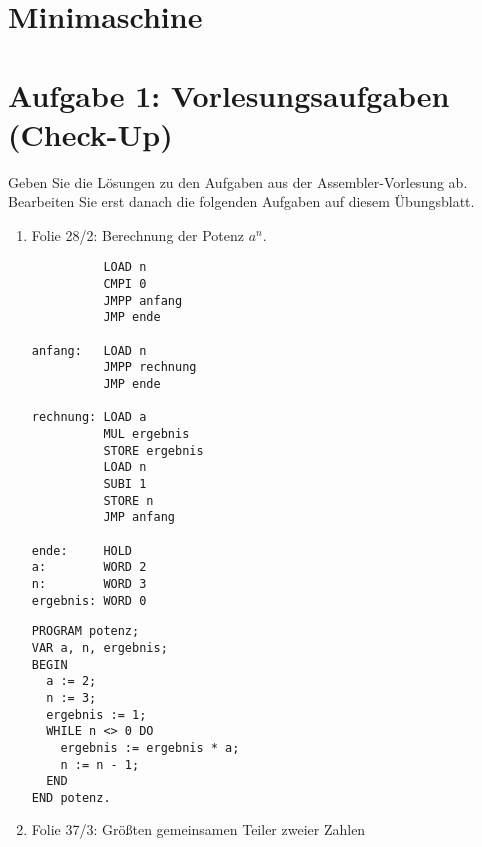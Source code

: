 \documentclass{lehramt-informatik-aufgabe}
\begin{document}
\section{Minimaschine}

\section{Aufgabe 1: Vorlesungsaufgaben (Check-Up)}

Geben Sie die Lösungen zu den Aufgaben aus der Assembler-Vorlesung
ab. Bearbeiten Sie erst danach die folgenden Aufgaben auf diesem
Übungsblatt.

\begin{enumerate}


\item Folie 28/2: Berechnung der Potenz $a^n$.

\begin{multicols}{2}

\begin{verbatim}
          LOAD n
          CMPI 0
          JMPP anfang
          JMP ende

anfang:   LOAD n
          JMPP rechnung
          JMP ende

rechnung: LOAD a
          MUL ergebnis
          STORE ergebnis
          LOAD n
          SUBI 1
          STORE n
          JMP anfang

ende:     HOLD
a:        WORD 2
n:        WORD 3
ergebnis: WORD 0
\end{verbatim}

\liSpaltenUmbruch
{}

\begin{verbatim}
PROGRAM potenz;
VAR a, n, ergebnis;
BEGIN
  a := 2;
  n := 3;
  ergebnis := 1;
  WHILE n <> 0 DO
    ergebnis := ergebnis * a;
    n := n - 1;
  END
END potenz.
\end{verbatim}
\end{multicols}


\newpage

\item Folie 37/3: Größten gemeinsamen Teiler zweier Zahlen

\begin{multicols}{2}


\end{multicols}
\end{enumerate}
\end{document}

